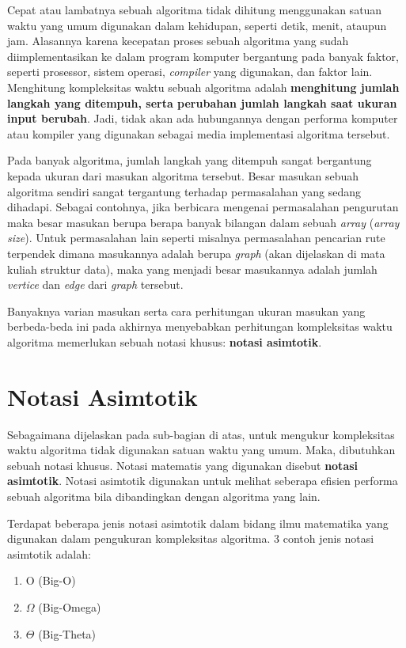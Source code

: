 Cepat atau lambatnya sebuah algoritma tidak dihitung menggunakan satuan waktu yang umum digunakan dalam kehidupan, seperti detik, menit, ataupun jam. Alasannya karena kecepatan proses sebuah algoritma yang sudah diimplementasikan ke dalam program komputer bergantung pada banyak faktor, seperti prosessor, sistem operasi, \textit{compiler} yang digunakan, dan faktor lain. Menghitung kompleksitas waktu sebuah algoritma adalah \textbf{menghitung jumlah langkah yang ditempuh, serta perubahan jumlah langkah saat ukuran input berubah}. Jadi, tidak akan ada hubungannya dengan performa komputer atau kompiler yang digunakan sebagai media implementasi algoritma tersebut.

Pada banyak algoritma, jumlah langkah yang ditempuh sangat bergantung kepada ukuran dari masukan algoritma tersebut. Besar masukan sebuah algoritma sendiri sangat tergantung terhadap permasalahan yang sedang dihadapi. Sebagai contohnya, jika berbicara mengenai permasalahan pengurutan maka besar masukan berupa berapa banyak bilangan dalam sebuah \textit{array} (\textit{array size}). Untuk permasalahan lain seperti misalnya permasalahan pencarian rute terpendek dimana masukannya adalah berupa \textit{graph} (akan dijelaskan di mata kuliah struktur data), maka yang menjadi besar masukannya adalah jumlah \textit{vertice} dan \textit{edge} dari \textit{graph} tersebut. 


Banyaknya varian masukan serta cara perhitungan ukuran masukan yang berbeda-beda ini pada akhirnya menyebabkan perhitungan kompleksitas waktu algoritma memerlukan sebuah notasi khusus: \textbf{notasi asimtotik}.

\section{Notasi Asimtotik}

Sebagaimana dijelaskan pada sub-bagian di atas, untuk mengukur kompleksitas waktu algoritma tidak digunakan satuan waktu yang umum. Maka, dibutuhkan sebuah notasi khusus. Notasi matematis yang digunakan disebut \textbf{notasi asimtotik}. Notasi asimtotik digunakan untuk melihat seberapa efisien performa sebuah algoritma bila dibandingkan dengan algoritma yang lain. 

Terdapat beberapa jenis notasi asimtotik dalam bidang ilmu matematika yang digunakan dalam pengukuran kompleksitas algoritma. 3 contoh jenis notasi asimtotik adalah:

\begin{enumerate}
    \item O (Big-O)
    \item $\Omega$ (Big-Omega)
    \item $\Theta$ (Big-Theta)
\end{enumerate}

